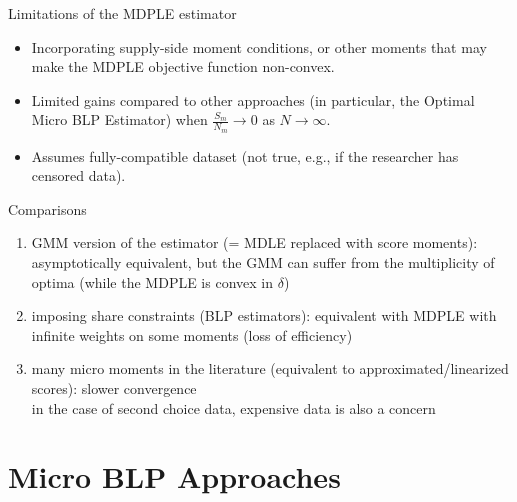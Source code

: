 \documentclass[aspectratio=169,10pt]{beamer}
\begin{document}
\begin{frame}{Limitations of the MDPLE estimator}
    
    \begin{itemize}

        \item Incorporating supply-side moment conditions, or other moments that may make the MDPLE objective function non-convex.
        \item Limited gains compared to other approaches (in particular, the Optimal Micro BLP Estimator) when $\frac{S_m}{N_m}\to 0$ as $N\to\infty$.
        \item Assumes fully-compatible dataset (not true, e.g., if the researcher has censored data).
    \end{itemize}
\end{frame}


\begin{frame}{Comparisons}

\begin{enumerate}

    \item GMM version of the estimator (= MDLE replaced with score moments): asymptotically equivalent, but the GMM can suffer from the multiplicity of optima (while the MDPLE is convex in $\delta$)
    \item imposing share constraints (BLP estimators): equivalent with MDPLE with infinite weights on some moments (loss of efficiency)
    \item many micro moments in the literature (equivalent to approximated/linearized scores): slower convergence\\
    \indent in the case of second choice data, expensive data is also a concern

\end{enumerate}

\end{frame}


\section*{Micro BLP Approaches}
\end{document}
